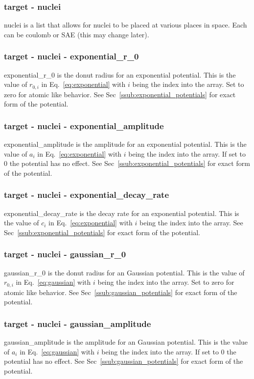 \documentclass{article}
\begin{document}
\subsubsection{target - nuclei}
nuclei is a list that allows for nuclei to be placed at various places in space. Each can be coulomb or SAE (this may change later).

\subsubsection{target - nuclei - exponential\_r\_0}
exponential\_r\_0 is the donut radius for an exponential potential. This is the value of $r_{0,i}$ in Eq.~\ref{eq:exponential} with $i$ being the index into the array. Set to zero for atomic like behavior. See Sec~\ref{ssub:exponential_potentials} for exact form of the potential.

\subsubsection{target - nuclei - exponential\_amplitude}
exponential\_amplitude is the amplitude for an exponential potential. This is the value of $a_i$ in Eq.~\ref{eq:exponential} with $i$ being the index into the array. If set to 0 the potential has no effect. See Sec~\ref{ssub:exponential_potentials} for exact form of the potential.

\subsubsection{target - nuclei - exponential\_decay\_rate}
exponential\_decay\_rate is the decay rate for an exponential potential. This is the value of $c_i$ in Eq.~\ref{eq:exponential} with $i$ being the index into the array. See Sec~\ref{ssub:exponential_potentials} for exact form of the potential.

\subsubsection{target - nuclei - gaussian\_r\_0}
gaussian\_r\_0 is the donut radius for an Gaussian potential. This is the value of $r_{0,i}$ in Eq.~\ref{eq:gaussian} with $i$ being the index into the array. Set to zero for atomic like behavior. See Sec~\ref{ssub:gaussian_potentials} for exact form of the potential.

\subsubsection{target - nuclei - gaussian\_amplitude}
gaussian\_amplitude is the amplitude for an Gaussian potential. This is the value of $a_i$ in Eq.~\ref{eq:gaussian} with $i$ being the index into the array. If set to 0 the potential has no effect. See Sec~\ref{ssub:gaussian_potentials} for exact form of the potential.
\end{document}
